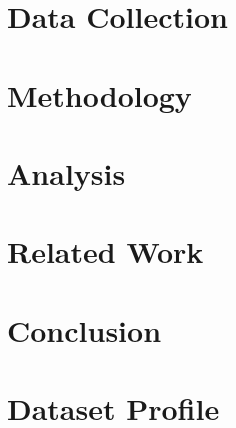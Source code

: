 \documentclass[10pt,twocolumn]{IEEEtran11}
\begin{document}
\section{Data Collection}
\label{sec:datacollection}


\section{Methodology}
\label{sec:methodology}


\section{Analysis}
\label{sec:analysis}


\section{Related Work}  
\label{sec:relatedwork}


\section{Conclusion}
\label{sec:conclusion}




\onecolumn
{}
\label{app:user-attributes}


\section{Dataset Profile}

\end{document}

